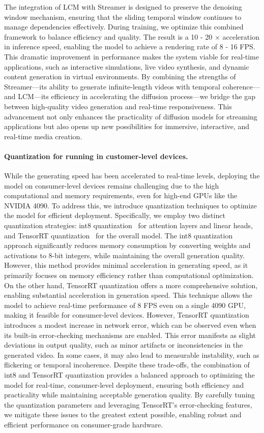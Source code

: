 The integration of LCM with Streamer is designed to preserve the denoising window mechanism, ensuring that the sliding temporal window continues to manage dependencies effectively. During training, we optimize this combined framework to balance efficiency and quality. The result is a 10 - 20 $\times$ acceleration in inference speed, enabling the model to achieve a rendering rate of 8 - 16 FPS. This dramatic improvement in performance makes the system viable for real-time applications, such as interactive simulations, live video synthesis, and dynamic content generation in virtual environments. By combining the strengths of Streamer—its ability to generate infinite-length videos with temporal coherence—and LCM—its efficiency in accelerating the diffusion process—we bridge the gap between high-quality video generation and real-time responsiveness. This advancement not only enhances the practicality of diffusion models for streaming applications but also opens up new possibilities for immersive, interactive, and real-time media creation.

\paragraph{Quantization for running in customer-level devices.} While the generating speed has been accelerated to real-time levels, deploying the model on consumer-level devices remains challenging due to the high computational and memory requirements, even for high-end GPUs like the NVIDIA 4090. To address this, we introduce quantization techniques to optimize the model for efficient deployment. Specifically, we employ two distinct quantization strategies: int8 quantization~\citep{torchao} for attention layers and linear heads, and TensorRT quantization~\citep{tensorrt} for the overall model. The int8 quantization approach significantly reduces memory consumption by converting weights and activations to 8-bit integers, while maintaining the overall generation quality. However, this method provides minimal acceleration in generating speed, as it primarily focuses on memory efficiency rather than computational optimization. On the other hand, TensorRT quantization offers a more comprehensive solution, enabling substantial acceleration in generation speed. This technique allows the model to achieve real-time performance of 8 FPS even on a single 4090 GPU, making it feasible for consumer-level devices. However, TensorRT quantization introduces a modest increase in network error, which can be observed even when its built-in error-checking mechanisms are enabled. This error manifests as slight deviations in output quality, such as minor artifacts or inconsistencies in the generated video. In some cases, it may also lead to measurable instability, such as flickering or temporal incoherence. Despite these trade-offs, the combination of int8 and TensorRT quantization provides a balanced approach to optimizing the model for real-time, consumer-level deployment, ensuring both efficiency and practicality while maintaining acceptable generation quality. By carefully tuning the quantization parameters and leveraging TensorRT’s error-checking features, we mitigate these issues to the greatest extent possible, enabling robust and efficient performance on consumer-grade hardware.

